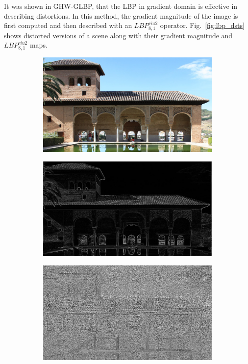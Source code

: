 It was shown in GHW-GLBP, that the LBP in gradient domain is effective in describing distortions. In this method, the gradient magnitude of the image is first computed and then described with an $LBP_{8, 1}^{riu2}$ operator. Fig.~\ref{fig:lbp_dsts} shows distorted versions of a scene along with their gradient magnitude and $LBP_{8, 1}^{riu2}$ maps.
\begin{figure}
     \centering
     \begin{subfigure}[b]{0.3\textwidth}
         \centering
         \includegraphics[width=\textwidth]{./figs/org009}
         \caption{}
         \label{}
     \end{subfigure}
     \hfill
     \begin{subfigure}[b]{0.3\textwidth}
         \centering
         \includegraphics[width=\textwidth]{./figs/gradientMap}
         \caption{}
         \label{}
     \end{subfigure}
     \hfill
     \begin{subfigure}[b]{0.3\textwidth}
         \centering
         \includegraphics[width= \textwidth]{./figs/lbp_gradient}

\end{subfigure}
\end{figure}
